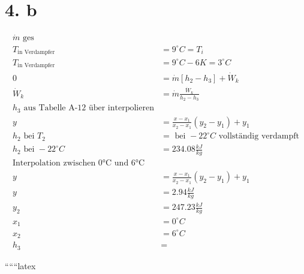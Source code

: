 \section*{4. b}

\begin{align*}
    \dot{m} \text{ ges} \\
    T_{\text{in Verdampfer}} &= 9^\circ C = T_i \\
    T_{\text{in Verdampfer}} &= 9^\circ C - 6 K = 3^\circ C \\
    0 &= \dot{m} \left[ h_2 - h_3 \right] + \dot{W}_k \\
    \dot{W}_k &= \dot{m} \frac{\dot{W}_k}{h_2 - h_3} \\
    h_3 \text{ aus Tabelle A-12 über interpolieren} \\
    y &= \frac{x - x_1}{x_2 - x_1} (y_2 - y_1) + y_1 \\
    h_2 \text{ bei } T_2 &= \text{ bei } -22^\circ C \text{ vollständig verdampft} \\
    h_2 \text{ bei } -22^\circ C &= 234.08 \frac{kJ}{kg} \\
    \text{Interpolation zwischen 0°C und 6°C} \\
    y &= \frac{x - x_1}{x_2 - x_1} (y_2 - y_1) + y_1 \\
    y &= 2.94 \frac{kJ}{kg} \\
    y_2 &= 247.23 \frac{kJ}{kg} \\
    x_1 &= 0^\circ C \\
    x_2 &= 6^\circ C \\
    h_3 &= 
\end{align*}

``````latex